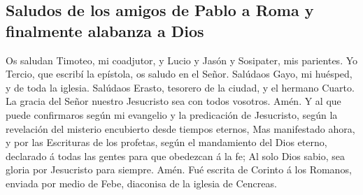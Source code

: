 \hypertarget{saludos-de-los-amigos-de-pablo-a-roma-y-finalmente-alabanza-a-dios}{%
\subsection{Saludos de los amigos de Pablo a Roma y finalmente alabanza
a
Dios}\label{saludos-de-los-amigos-de-pablo-a-roma-y-finalmente-alabanza-a-dios}}

 Os saludan Timoteo, mi coadjutor, y Lucio y Jasón y
Sosipater, mis parientes.  Yo Tercio, que escribí la
epístola, os saludo en el Señor.  Salúdaos Gayo, mi
huésped, y de toda la iglesia. Salúdaos Erasto, tesorero de la ciudad, y
el hermano Cuarto.  La gracia del Señor nuestro
Jesucristo sea con todos vosotros. Amén.  Y al que puede
confirmaros según mi evangelio y la predicación de Jesucristo, según la
revelación del misterio encubierto desde tiempos eternos,
 Mas manifestado ahora, y por las Escrituras de los
profetas, según el mandamiento del Dios eterno, declarado á todas las
gentes para que obedezcan á la fe;  Al solo Dios sabio,
sea gloria por Jesucristo para siempre. Amén. Fué escrita de Corinto á
los Romanos, enviada por medio de Febe, diaconisa de la iglesia de
Cencreas.
